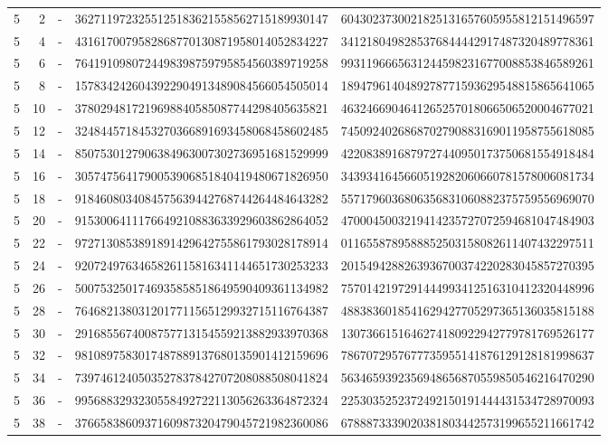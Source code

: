 \begin{longtable}{rrrll}
5 & 2 & - & 3627119723255125183621558562715189930147 & 6043023730021825131657605955812151496597 \\
5 & 4 & - & 4316170079582868770130871958014052834227 & 3412180498285376844442917487320489778361 \\
5 & 6 & - & 7641910980724498398759795854560389719258 & 9931196665631244598231677008853846589261 \\
5 & 8 & - & 1578342426043922904913489084566054505014 & 1894796140489278771593629548815865641065 \\
5 & 10 & - & 3780294817219698840585087744298405635821 & 4632466904641265257018066506520004677021 \\
5 & 12 & - & 3248445718453270366891693458068458602485 & 7450924026868702790883169011958755618085 \\
5 & 14 & - & 8507530127906384963007302736951681529999 & 4220838916879727440950173750681554918484 \\
5 & 16 & - & 3057475641790053906851840419480671826950 & 3439341645660519282060660781578006081734 \\
5 & 18 & - & 9184608034084575639442768744264484643282 & 5571796036806356831060882375759556969070 \\
5 & 20 & - & 9153006411176649210883633929603862864052 & 4700045003219414235727072594681047484903 \\
5 & 22 & - & 9727130853891891429642755861793028178914 & 0116558789588852503158082611407432297511 \\
5 & 24 & - & 9207249763465826115816341144651730253233 & 2015494288263936700374220283045857270395 \\
5 & 26 & - & 5007532501746935858518649590409361134982 & 7570142197291444993412516310412320448996 \\
5 & 28 & - & 7646821380312017711565129932715116764387 & 4883836018541629427705297365136035815188 \\
5 & 30 & - & 2916855674008757713154559213882933970368 & 1307366151646274180922942779781769526177 \\
5 & 32 & - & 9810897583017487889137680135901412159696 & 7867072957677735955141876129128181998637 \\
5 & 34 & - & 7397461240503527837842707208088508041824 & 5634659392356948656870559850546216470290 \\
5 & 36 & - & 9956883293230558492722113056263364872324 & 2253035252372492150191444431534728970093 \\
5 & 38 & - & 3766583860937160987320479045721982360086 & 6788873339020381803442573199655211661742 \\

\end{longtable}
